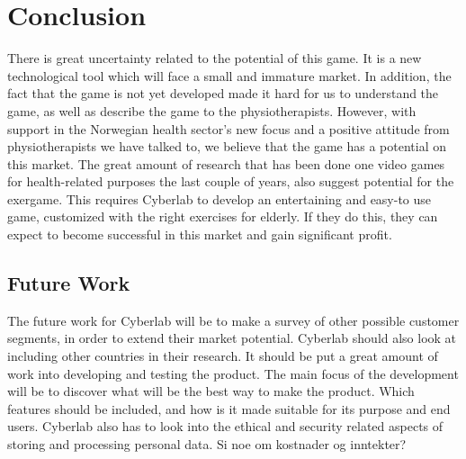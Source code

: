 \chapter{Conclusion}
There is great uncertainty related to the potential of this game. It is a new technological tool which will face a small and immature market. In addition, the fact that the game is not yet developed made it hard for us to understand the game, as well as describe the game to the physiotherapists. However, with support in the Norwegian health sector's new focus and a positive attitude from physiotherapists we have talked to, we believe that the game has a potential on this market. The great amount of research that has been done one video games for health-related purposes the last couple of years, also suggest potential for the exergame. This requires Cyberlab to develop an entertaining and easy-to use game, customized with the right exercises for elderly. If they do this, they can expect to become successful in this market and gain significant profit.  
\section{Future Work}
The future work for Cyberlab will be to make a survey of other possible customer segments, in order to extend their market potential. Cyberlab should also look at including other countries in their research.
It should be put a great amount of work into developing and testing the product. The main focus of the development will be to discover what will be the best way to make the product. Which features should be included, and how is it made suitable for its purpose and end users.
Cyberlab also has to look into the ethical and security related aspects of storing and processing personal data. 
Si noe om kostnader og inntekter? 